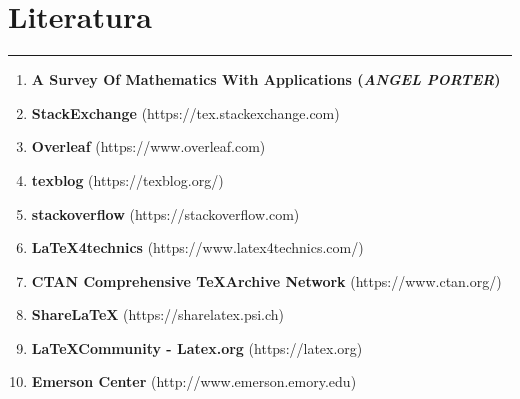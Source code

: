 \documentclass[a4paper,14pt,svgnames]{article}
\begin{document}
\newpage
\section*{\textbf{Literatura}}
\hrule
\bigskip\bigskip
\large
\begin{enumerate}
\item \textbf{A Survey Of Mathematics With Applications (\textit{ANGEL PORTER})}
\item \textbf{StackExchange} (https://tex.stackexchange.com)
\item \textbf{Overleaf} (https://www.overleaf.com)
\item \textbf{texblog} (https://texblog.org/)
\item \textbf{stackoverflow} (https://stackoverflow.com)
\item \textbf{\LaTeX 4technics} (https://www.latex4technics.com/)
\item \textbf{CTAN Comprehensive \TeX Archive Network} (https://www.ctan.org/)
\item \textbf{Share\LaTeX} (https://sharelatex.psi.ch)
\item \textbf{\LaTeX Community - Latex.org} (https://latex.org)
\item \textbf{Emerson Center} (http://www.emerson.emory.edu)
\end{enumerate}

\end{document}
